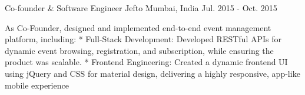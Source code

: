 

\begin{cventries}
  
  \cventry
    {Co-founder \& Software Engineer} %
    {Jefto} %
    {Mumbai, India} %
    {Jul. 2015 - Oct. 2015} %
    {
      \begin{cvitems} %
        \item {As Co-Founder, designed and implemented end-to-end event management platform, including: * Full-Stack Development: Developed RESTful APIs for dynamic event browsing, registration, and subscription, while ensuring the product was scalable. * Frontend Engineering: Created a dynamic frontend UI using jQuery and CSS for material design, delivering a highly responsive, app-like mobile experience}
      \end{cvitems}
    }

\end{cventries}




